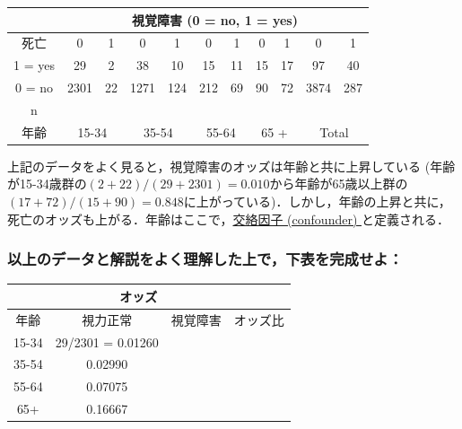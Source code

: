 \documentclass[11pt,]{problemset}
\begin{document}
\begin{center}
\begin{tabular}{|c|c|c|c|c|c|c|c|c|c|c|}
\hline
       & \multicolumn{10}{c|}{視覚障害 (0 = no, 1 = yes)}                                                                                                  \\ \hline
死亡     & 0             & 1          & 0            & 1           & 0            & 1           & 0           & 1           & 0            & 1           \\ \hline
1 = yes & 29            & 2          & 38           & 10          & 15           & 11          & 15          & 17          & 97           & 40          \\ \hline
0 = no & 2301          & 22         & 1271         & 124         & 212          & 69          & 90          & 72          & 3874         & 287         \\ \hline
  n     &           &           &          &          &           &           &           &           &          &          \\ \hline
年齢     & \multicolumn{2}{c|}{15-34} & \multicolumn{2}{c|}{35-54} & \multicolumn{2}{c|}{55-64} & \multicolumn{2}{c|}{65 +} & \multicolumn{2}{c|}{Total} \\ \hline
\end{tabular}
\end{center}

上記のデータをよく見ると，視覚障害のオッズは年齢と共に上昇している
(年齢が15-34歳群の\((2 + 22) / (29 + 2301) = 0.010\)から年齢が65歳以上群の\((17+72)/(15+90) = 0.848\)に上がっている)．しかし，年齢の上昇と共に，死亡のオッズも上がる．年齢はここで，\underline{交絡因子 (confounder) }と定義される．

\subsubsection{以上のデータと解説をよく理解した上で，下表を完成せよ：}

\begin{center}
\begin{tabular}{|c|c|c|c|}
\hline
      & \multicolumn{2}{c|}{オッズ}    &        \\ \hline
年齢    & 視力正常              & 視覚障害    & オッズ比   \\ \hline
15-34 & 29/2301 = 0.01260 &   &   \\ \hline
35-54 & 0.02990           &  &  \\ \hline
55-64 & 0.07075           &  &  \\ \hline
65+   & 0.16667           &  &  \\ \hline
\end{tabular}
\end{center}
\end{document}
